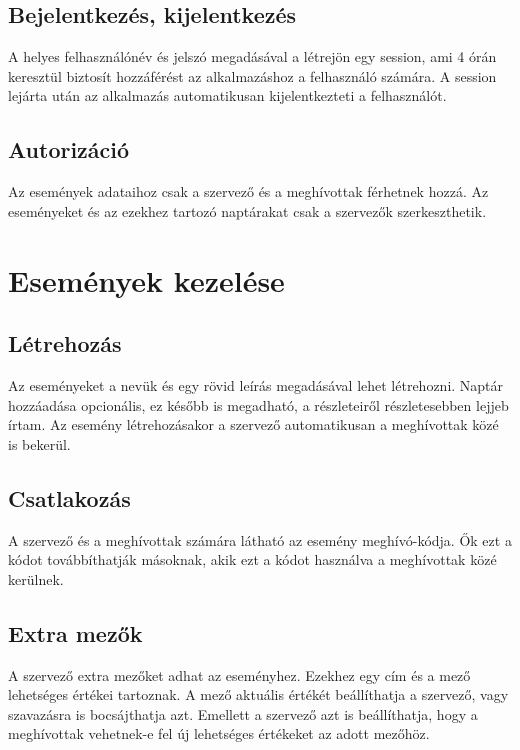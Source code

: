 \documentclass[a4paper,12pt]{report}
\theoremstyle{definition}
\theoremstyle{remark}
\begin{document}
	\subsection{Bejelentkezés, kijelentkezés}

A helyes felhasználónév és jelszó megadásával a létrejön egy session, ami 4 órán keresztül biztosít hozzáférést az alkalmazáshoz a felhasználó számára. A session lejárta után az alkalmazás automatikusan kijelentkezteti a felhasználót.

	\subsection{Autorizáció}

Az események adataihoz csak a szervező és a meghívottak férhetnek hozzá. Az eseményeket és az ezekhez tartozó naptárakat csak a szervezők szerkeszthetik.

\section{Események kezelése}

	\subsection{Létrehozás}

Az eseményeket a nevük és egy rövid leírás megadásával lehet létrehozni. Naptár hozzáadása opcionális, ez később is megadható, a részleteiről részletesebben lejjeb írtam.  Az esemény létrehozásakor a szervező automatikusan a meghívottak közé is bekerül.

	\subsection{Csatlakozás}

A szervező és a meghívottak számára látható az esemény meghívó-kódja. Ők ezt a kódot továbbíthatják másoknak, akik ezt a kódot használva a meghívottak közé kerülnek.

	\subsection{Extra mezők}

A szervező extra mezőket adhat az eseményhez. Ezekhez egy cím és a mező lehetséges értékei tartoznak. A mező aktuális értékét beállíthatja a szervező, vagy szavazásra is bocsájthatja azt. Emellett a szervező azt is beállíthatja, hogy a meghívottak vehetnek-e fel új lehetséges értékeket az adott mezőhöz.
\end{document}
